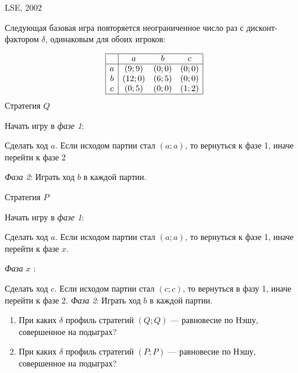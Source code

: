 \begin{problem}
\begin{source}
LSE, 2002
\end{source}
Следующая базовая игра повторяется неограниченное число раз с дисконт-фактором  $\delta $, одинаковым для обоих игроков:

\[\begin{array}{|c|ccc|}  \hline {} & {a} & {b} & {c} \\  \hline {a} & {\left(9;9\right)} & {\left(0;0\right)} & {\left(0;0\right)} \\ {b} & {\left(12;0\right)} & {\left(6;5\right)} & {\left(0;0\right)} \\ {c} & {\left(0;5\right)} & {\left(0;0\right)} & {\left(1;2\right)} \\  \hline  \end{array}\]
Стратегия  $Q$\par
Начать игру в {\it фазе 1}:\par
Сделать ход  $a$. Если исходом партии стал  $\left(a;a\right)$, то вернуться к фазе 1, иначе перейти к фазе 2\par
{\it Фаза 2}: Играть ход  $b$  в каждой партии.\par

Стратегия  $P$\par
Начать игру в {\it фазе 1}:\par
Сделать ход  $a$. Если исходом партии стал  $\left(a;a\right)$, то вернуться к фазе 1, иначе перейти к фазе  $x$.\par
{\it Фаза } $x$ :\par
Сделать ход  $c$. Если исходом партии стал  $\left(c;c\right)$, то вернуться в фазу 1, иначе перейти к фазе 2.
{\it Фаза 2}: Играть ход  $b$  в каждой партии.\par
\begin{enumerate}
\item При каких  $\delta $  профиль стратегий  $\left(Q;Q\right)$  --- равновесие по Нэшу, совершенное на подыграх?\par
\item При каких  $\delta $  профиль стратегий  $\left(P;P\right)$  --- равновесие по Нэшу, совершенное на подыграх?
\end{enumerate}


\begin{sol}

\end{sol}
\end{problem}




